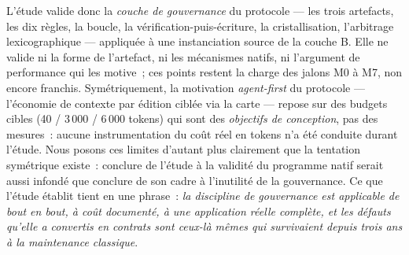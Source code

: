 L’étude valide donc la \emph{couche de gouvernance} du protocole — les
trois artefacts, les dix règles, la boucle, la vérification-puis-écriture,
la cristallisation, l’arbitrage lexicographique — appliquée à une
instanciation source de la couche B. Elle ne valide ni la forme de
l’artefact, ni les mécanismes natifs, ni l’argument de performance qui
les motive~; ces points restent la charge des jalons M0 à M7, non
encore franchis. Symétriquement, la motivation \emph{agent-first} du
protocole — l’économie de contexte par édition ciblée via la carte —
repose sur des budgets cibles (40 / 3\,000 / 6\,000 tokens) qui sont des
\emph{objectifs de conception}, pas des mesures~: aucune instrumentation
du coût réel en tokens n’a été conduite durant l’étude. Nous posons ces
limites d’autant plus clairement que la tentation symétrique existe~:
conclure de l’étude à la validité du programme natif serait aussi
infondé que conclure de son cadre à l’inutilité de la gouvernance. Ce
que l’étude établit tient en une phrase~: \emph{la discipline de
gouvernance est applicable de bout en bout, à coût documenté, à une
application réelle complète, et les défauts qu’elle a convertis en
contrats sont ceux-là mêmes qui survivaient depuis trois ans à la
maintenance classique}.
